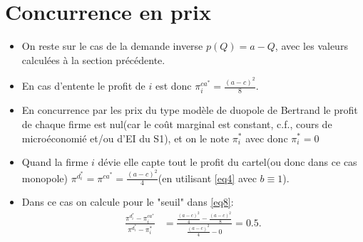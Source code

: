\documentclass[notes, ignorenonframetext, compress, 9pt, xcolor=svgnames, aspectratio=169]{beamer}
\begin{document}
\section{Concurrence en prix}
\frame{\sectionpage}
\begin{frame}
[allowframebreaks]{\insertsection}
\begin{itemize}
    \item On reste sur le cas de la demande inverse $p(Q) = a-Q$, avec les valeurs calculées à la section précédente.
    \item En cas d'entente le profit de $i$ est donc $\pi_i ^{ca^*}  = \frac{(a-c)^2}{8}$.
    \item En concurrence par les prix du type modèle de duopole de Bertrand le profit de chaque firme est nul(car le coût marginal est constant, c.f., cours de microéconomié et/ou d'EI du S1), et on le note $\pi_i^*$ avec donc $\pi_i^* = 0$
    \item Quand la firme $i$ dévie elle capte tout le profit du cartel(ou donc dans ce cas monopole) $\pi^{d^*_i}  = \pi ^{ca^*} =  \frac{(a-c)^2}{4}$(en utilisant \eqref{eq4} avec $b\equiv 1$).
    \item Dans ce cas on calcule pour le "seuil" dans \eqref{eq8}:
    \begin{align*}
    \frac{\pi^{d^*_i} - \pi_i^{ca^*} }{\pi^{d^*_i}  - \pi_i^*}& = \frac{ \frac{(a-c)^2}{4} - \frac{(a-c)^2}{8}}{\frac{(a-c)^2}{4} - 0} = 0.5.
    \end{align*}
\end{itemize}
\end{frame}
\end{document}
